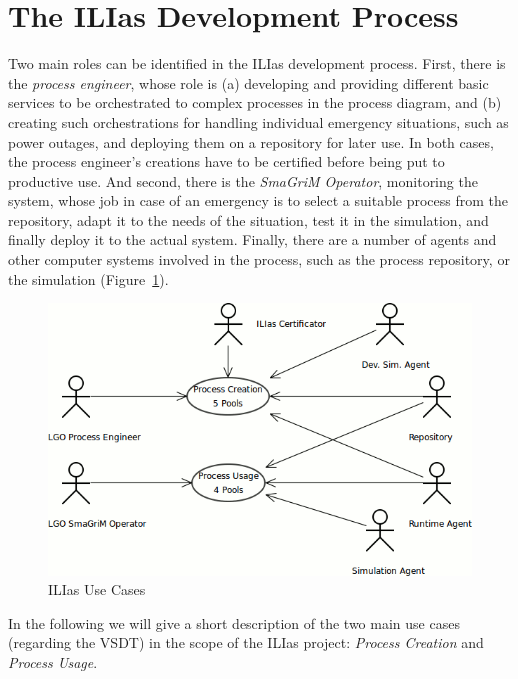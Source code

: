 
\section{The ILIas Development Process}

Two main roles can be identified in the ILIas development process.  First, there
is the \emph{process engineer}, whose role is (a) developing and providing
different basic services to be orchestrated to complex processes in the process
diagram, and (b) creating such orchestrations for handling individual emergency
situations, such as power outages, and deploying them on a repository for later
use.  In both cases, the process engineer's creations have to be certified before
being put to productive use.  And second, there is the \emph{SmaGriM Operator},
monitoring the system, whose job in case of an emergency is to select a suitable
process from the repository, adapt it to the needs of the situation, test it in
the simulation, and finally deploy it to the actual system.  Finally, there are
a number of agents and other computer systems involved in the process, such as
the process repository, or the simulation (Figure~\ref{fig:ilias-use-cases}).

\begin{figure}[ht]
	\centering
	\includegraphics[width=.5\textwidth]{ilias/bpmn_ilias-1.png}
	\caption{ILIas Use Cases}
	\label{fig:ilias-use-cases}
\end{figure}

In the following we will give a short description of the two main use cases
(regarding the VSDT) in the scope of the ILIas project: \emph{Process Creation}
and \emph{Process Usage}.


